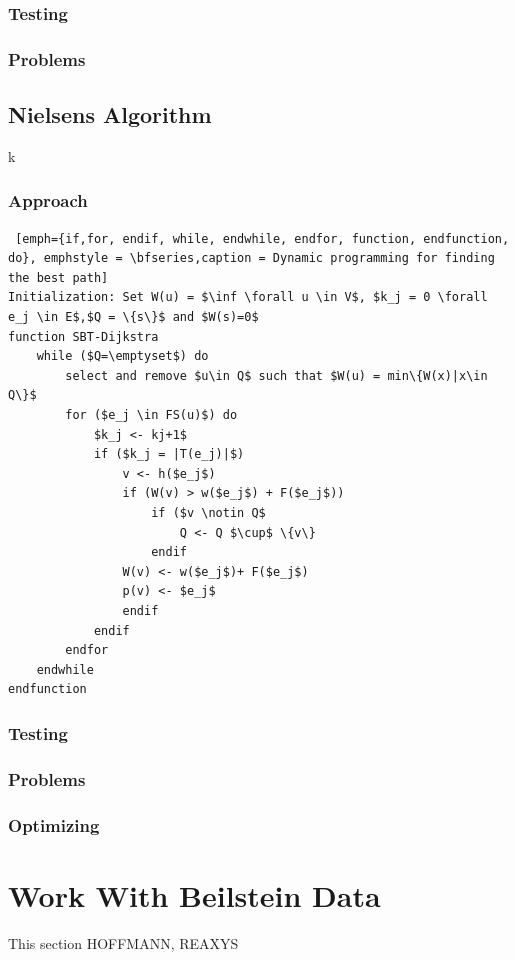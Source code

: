\documentclass[a4paper,10pt,titlepage]{paper}
\begin{document}
\subsubsection{Testing}
\subsubsection{Problems}

\subsection{Nielsens Algorithm}
k \cite{Nielsen}
\subsubsection{Approach}
\begin{lstlisting} [emph={if,for, endif, while, endwhile, endfor, function, endfunction, do}, emphstyle = \bfseries,caption = Dynamic programming for finding the best path]
Initialization: Set W(u) = $\inf \forall u \in V$, $k_j = 0 \forall e_j \in E$,$Q = \{s\}$ and $W(s)=0$
function SBT-Dijkstra
	while ($Q=\emptyset$) do
		select and remove $u\in Q$ such that $W(u) = min\{W(x)|x\in Q\}$
		for ($e_j \in FS(u)$) do
			$k_j <- kj+1$
			if ($k_j = |T(e_j)|$) 
				v <- h($e_j$)
				if (W(v) > w($e_j$) + F($e_j$))
					if ($v \notin Q$  
						Q <- Q $\cup$ \{v\}
					endif
				W(v) <- w($e_j$)+ F($e_j$)
				p(v) <- $e_j$
				endif
			endif
		endfor
	endwhile
endfunction
\end{lstlisting}
\subsubsection{Testing}
\subsubsection{Problems}
\subsubsection{Optimizing}

\section{Work With Beilstein Data}
This section HOFFMANN, REAXYS
\end{document}
